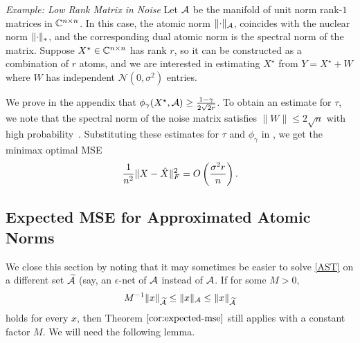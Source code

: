 \emph{Example: Low Rank Matrix in Noise}
Let $\mathcal{A}$ be the manifold of unit norm rank-$1$ matrices in $\mathbb{C}^{n\times n}$. In
this case, the atomic norm $\lVert\cdot\rVert_{\mathcal{A}}$, coincides with the nuclear norm
$\lVert\cdot\rVert_*$, and the corresponding dual atomic norm is the spectral norm
of the matrix. Suppose $X^\star \in \mathbb{C}^{n\times n}$ has rank $r$, so it can be
constructed as a combination of $r$ atoms, and we are interested in estimating
$X^\star$ from $Y = X^\star + W$ where $W$ has independent
$\mathcal{N}(0,\sigma^2)$ entries.

We prove in the appendix that $\phi_\gamma(X^\star,\mathcal{A}) \geq
\frac{1-\gamma}{2\sqrt{2r}}$. To obtain an estimate for $\tau$, we note that
the spectral norm of the noise matrix satisfies $\|W\|\leq
2\sqrt{n}$ with high probability~\cite{Davidson01}. Substituting these
estimates for $\tau$ and $\phi_\gamma$ in , we get
the minimax optimal MSE
\begin{align*}
\frac{1}{n^2}\lVert X-\hat{X}\rVert_F^2 = O\left( \frac{\sigma^2 r}{n} \right).
\end{align*}
\subsection{Expected MSE for Approximated Atomic Norms}
\label{proof:expected-mse-approx}

We close this section by noting that it may sometimes be easier to solve
\eqref{AST} on a different set $\widetilde{\mathcal{A}}$ (say, an $\epsilon$-net of
$\mathcal{A}$ instead of $\mathcal{A}$. If for some $M>0,$
\[
M^{-1}\lVert x\rVert_{\widetilde{\mathcal{A}}} \leq \lVert x\rVert_{\mathcal{A}} \leq \lVert x\rVert_{\widetilde{\mathcal{A}}}
\] 
holds for every $x$, then Theorem $\ref{cor:expected-mse}$ still applies with a constant factor $M$. We will need the following lemma.

